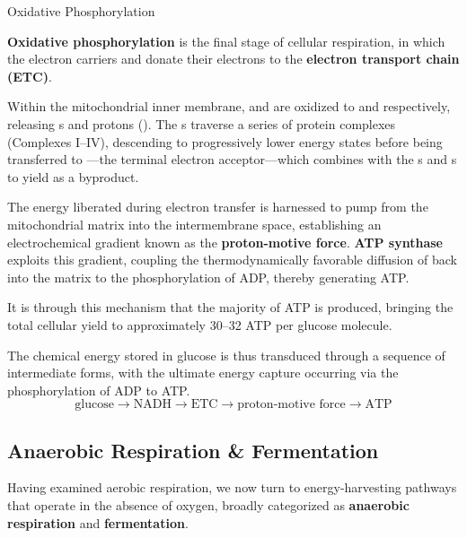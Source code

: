 \documentclass[10pt]{article}
\begin{document}
    \begin{core}[label=core:ox_phos]{Oxidative Phosphorylation}

      \textbf{Oxidative phosphorylation} is the final stage of cellular respiration, in which the electron carriers  and  donate their electrons to the \textbf{electron transport chain (ETC)}.


      Within the mitochondrial inner membrane,  and  are oxidized to  and  respectively, releasing s and protons (). The s traverse a series of protein complexes (Complexes I--IV), descending to progressively lower energy states before being transferred to ---the terminal electron acceptor---which combines with the s and s to yield  as a byproduct.

      The energy liberated during electron transfer is harnessed to pump  from the mitochondrial matrix into the intermembrane space, establishing an electrochemical gradient known as the \textbf{proton-motive force}. \textbf{ATP synthase} exploits this gradient, coupling the thermodynamically favorable diffusion of  back into the matrix to the phosphorylation of ADP, thereby generating ATP.

      It is through this mechanism that the majority of ATP is produced, bringing the total cellular yield to approximately 30--32 ATP per glucose molecule.

    \end{core}

    The chemical energy stored in glucose is thus transduced through a sequence of intermediate forms, with the ultimate energy capture occurring via the phosphorylation of ADP to ATP.
    \[
      \text{glucose} \rightarrow \text{NADH} \rightarrow \text{ETC} \rightarrow \text{proton-motive force} \rightarrow \text{ATP}
    \]

  \subsection{Anaerobic Respiration \& Fermentation}
    
    Having examined aerobic respiration, we now turn to energy-harvesting pathways that operate in the absence of oxygen, broadly categorized as \textbf{anaerobic respiration} and \textbf{fermentation}.
\end{document}
